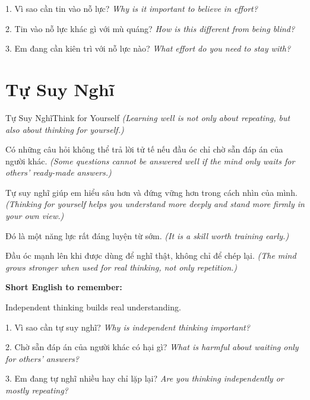\begin{tuhocnhanh}
1. Vì sao cần tin vào nỗ lực? \textit{Why is it important to believe in effort?}

2. Tin vào nỗ lực khác gì với mù quáng? \textit{How is this different from being blind?}

3. Em đang cần kiên trì với nỗ lực nào? \textit{What effort do you need to stay with?}
\end{tuhocnhanh}
\ngancach

\section{Tự Suy Nghĩ}
\begin{truyen}{Tự Suy Nghĩ}{Think for Yourself}
\textit{(Learning well is not only about repeating, but also about thinking for yourself.)}

Có những câu hỏi không thể trả lời tử tế nếu đầu óc chỉ chờ sẵn đáp án của người khác.
\textit{(Some questions cannot be answered well if the mind only waits for others' ready-made answers.)}

Tự suy nghĩ giúp em hiểu sâu hơn và đứng vững hơn trong cách nhìn của mình.
\textit{(Thinking for yourself helps you understand more deeply and stand more firmly in your own view.)}

Đó là một năng lực rất đáng luyện từ sớm.
\textit{(It is a skill worth training early.)}
\end{truyen}

\begin{baihoc}
Đầu óc mạnh lên khi được dùng để nghĩ thật, không chỉ để chép lại.
\textit{(The mind grows stronger when used for real thinking, not only repetition.)}
\end{baihoc}

\begin{ghinhoanh}
\textbf{Short English to remember:}

Independent thinking builds real understanding.

\end{ghinhoanh}

\begin{tuhocnhanh}
1. Vì sao cần tự suy nghĩ? \textit{Why is independent thinking important?}

2. Chờ sẵn đáp án của người khác có hại gì? \textit{What is harmful about waiting only for others' answers?}

3. Em đang tự nghĩ nhiều hay chỉ lặp lại? \textit{Are you thinking independently or mostly repeating?}
\end{tuhocnhanh}
\ngancach

